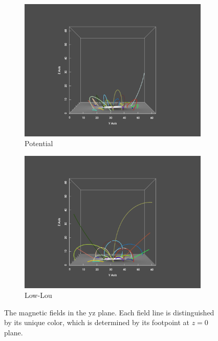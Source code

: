 \begin{figure}
  \begin{subfigure}{.5\linewidth}
    \centering
    \caption{Potential}
    \includegraphics[trim={6cm 1cm 6cm 2cm}, clip, width=\linewidth]{"img/LL_pot_yz.pdf"}
  \end{subfigure}%
  \begin{subfigure}{.5\linewidth}
    \centering
    \caption{Low-Lou}
    \includegraphics[trim={6cm 1cm 6cm 2cm}, clip, width=\linewidth]{"img/LL_yz.pdf"}
  \end{subfigure}
  
  \caption{The magnetic fields in the yz plane. Each field line is distinguished by its unique color, which is determined by its footpoint at $z=0$ plane.}\label{fig:yz}
\end{figure}

